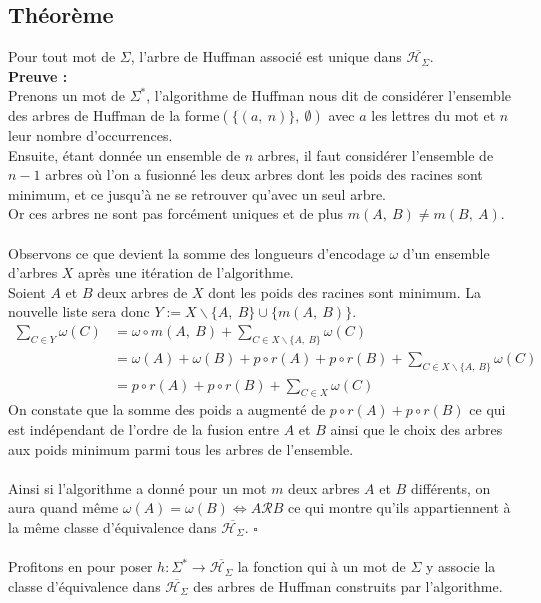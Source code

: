\documentclass[a4paper, 12pt]{article}
\let\iff\Longleftrightarrow
\let\qed\square
\begin{document}
\subsection{Théorème}
Pour tout mot de $\Sigma$, l'arbre de Huffman associé est unique dans $\overline{\mathcal{H}_\Sigma}$. \\
\textbf{Preuve :} \\
Prenons un mot de $\Sigma^*$, l'algorithme de Huffman nous dit de considérer l'ensemble des arbres de Huffman de la forme$(\{(a,\ n)\},\ \emptyset)$ avec $a$ les lettres du mot et $n$ leur nombre d'occurrences. \\
Ensuite, étant donnée un ensemble de $n$ arbres, il faut considérer l'ensemble de $n-1$ arbres où l'on a fusionné les deux arbres dont les poids des racines sont minimum, et ce jusqu'à ne se retrouver qu'avec un seul arbre. \\
Or ces arbres ne sont pas forcément uniques et de plus $m(A,\ B) \neq m(B,\ A)$. \\ \\
Observons ce que devient la somme des longueurs d'encodage $\omega$ d'un ensemble d'arbres $X$ après une itération de l'algorithme. \\
Soient $A$ et $B$ deux arbres de $X$ dont les poids des racines sont minimum. La nouvelle liste sera donc $Y := X\backslash\{A,\ B\}\cup\{m(A,\ B)\}$.
\begin{align*}
\sum_{C\in Y} \omega(C) &= \omega\circ m(A,\ B)+\sum_{C\in X\backslash\{A,\ B\}} \omega(C) \\
&= \omega(A)+\omega(B)+p\circ r(A)+p\circ r(B)+\sum_{C\in X\backslash\{A,\ B\}} \omega(C) \\
&= p\circ r(A)+p\circ r(B)+\sum_{C\in X} \omega(C)
\end{align*}
On constate que la somme des poids a augmenté de $p\circ r(A)+p\circ r(B)$ ce qui est indépendant de l'ordre de la fusion entre $A$ et $B$ ainsi que le choix des arbres aux poids minimum parmi tous les arbres de l'ensemble. \\ \\
Ainsi si l'algorithme a donné pour un mot $m$ deux arbres $A$ et $B$ différents, on aura quand même $\omega(A) = \omega(B) \iff A\mathcal{R}B$ ce qui montre qu'ils appartiennent à la même classe d'équivalence dans $\overline{\mathcal{H}_\Sigma}$. $\qed$ \\ \\
Profitons en pour poser $h: \Sigma^* \rightarrow \overline{\mathcal{H}_\Sigma}$ la fonction qui à un mot de $\Sigma$ y associe la classe d'équivalence dans $\overline{\mathcal{H}_\Sigma}$ des arbres de Huffman construits par l'algorithme.
\end{document}
